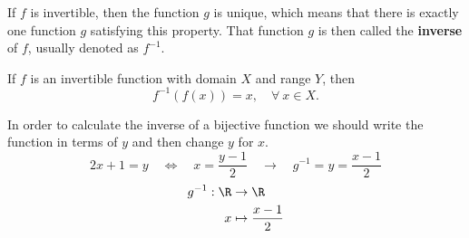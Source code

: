 If $f$ is invertible, then the function $g$ is unique, which means that there is exactly one function $g$ satisfying this property. That function $g$ is then called the \textbf{inverse} of $f$, usually denoted as $f^{-1}$.
\begin{proposition}
    If $f$ is an invertible function with domain $X$ and range $Y$, then
    \begin{equation}
        f^{-1}\left( f\left( x \right)  \right) = x,\quad \forall\ x\in X.
    \end{equation}
\end{proposition}
\begin{example}
    In order to calculate the inverse of a bijective function we should write the function in terms of $y$ and then change $y$ for $x$.
    \begin{equation}
        2x + 1 = y \quad\iff\quad x = \frac{y - 1}{2} \quad\rightarrow\quad g^{-1} = y = \frac{x - 1}{2}
    \end{equation}
    \begin{align}
        g^{-1}:\R&\to\R \\ x&\mapsto \frac{x - 1}{2}
    \end{align}
\end{example}
